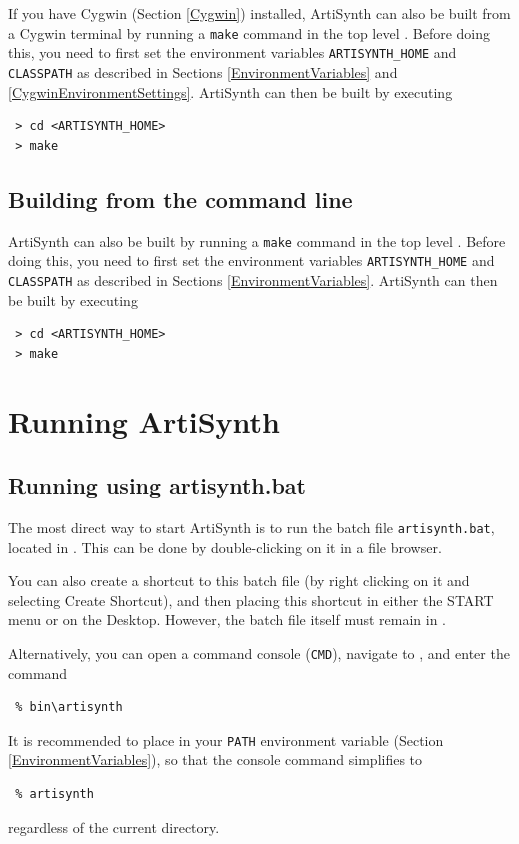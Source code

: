 If you have Cygwin (Section \ref{Cygwin}) installed, 
ArtiSynth can also be built from a Cygwin terminal by running
a {\tt make} command in the top level \directory{}. Before doing this,
you need to first set the environment variables {\tt ARTISYNTH\_HOME}
and {\tt CLASSPATH} as described in Sections
\ref{EnvironmentVariables} and \ref{CygwinEnvironmentSettings}.
ArtiSynth can then be built by executing

\begin{verbatim}
 > cd <ARTISYNTH_HOME>
 > make
\end{verbatim}
\else
\subsection{Building from the command line}
\label{BuildingWithCygwin}

ArtiSynth can also be built by running a {\tt make} command in the top
level \directory{}. Before doing this, you need to first set the environment
variables {\tt ARTISYNTH\_HOME} and {\tt CLASSPATH} as described in
Sections \ref{EnvironmentVariables}. ArtiSynth can then be built by
executing

\begin{verbatim}
 > cd <ARTISYNTH_HOME>
 > make
\end{verbatim}
\fi

\section{Running ArtiSynth}
\label{Running}

\ifWindows
\subsection{Running using artisynth.bat}
\label{artisynthBat}

The most direct way to start ArtiSynth is to run the batch file
{\tt artisynth.bat}, located in .  This can be
done by double-clicking on it in a file browser.

You can also create a shortcut to this batch file (by right clicking
on it and selecting {\sf Create Shortcut}), and then placing this shortcut
in either the {\sf START} menu or on the Desktop. However, the batch file
itself must remain in .

Alternatively, you can open a command console ({\tt CMD}), navigate
to \ArtHome[], and enter the command
%
\begin{verbatim}
 % bin\artisynth
\end{verbatim}
%
It is recommended to place  
in your {\tt PATH} environment variable (Section \ref{EnvironmentVariables}),
so that the console command simplifies to
\begin{verbatim}
 % artisynth
\end{verbatim}
regardless of the current directory.

